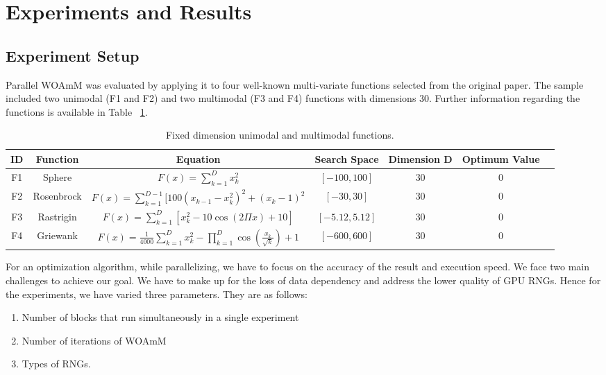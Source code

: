 \documentclass[conference]{IEEEtran}
\begin{document}
\section{Experiments and Results}

\subsection{Experiment Setup}

Parallel WOAmM was evaluated by applying it to four well-known multi-variate functions selected from the original paper. 
The sample included two unimodal (F1 and F2) and two multimodal (F3 and F4) functions with dimensions 30. 
Further information regarding the functions is available in Table ~\ref{tbl:func}.

\begin{table}[!t]\renewcommand{\arraystretch}{1.3}
\caption{Fixed dimension unimodal and multimodal functions.}
\label{tbl:func}
\centering
\begin{tabular}{c||c||c||c||c||c||c}
\hline\bfseries ID & \bfseries Function & \bfseries Equation & \bfseries Search Space & \bfseries Dimension D & \bfseries Optimum Value\\
\hline
\hline F1 & Sphere & \(F(x)=\sum_{k=1}^Dx_k^2\) & \([-100,100]\)&30&0\\
\hline
\hline F2 & Rosenbrock & \(F(x)=\sum_{k=1}^{D-1}[100(x_{k-1}-x_k^2)^2+(x_k-1)^2\) & \([-30,30]\)&30&0\\
\hline
\hline F3 & Rastrigin & \(F(x)=\sum_{k=1}^{D}[x_k^2-10\cos(2\Pi x)+10]\) & \([-5.12,5.12]\)&30&0\\
\hline
\hline F4 & Griewank & \(F(x)=\frac{1}{4000}\sum_{k=1}^{D}x_k^2-\prod_{k=1}^D\cos(\frac{x_k}{\sqrt{k}})+1\) & \([-600,600]\)&30&0\\
\hline
\end{tabular}
\end{table}

For an optimization algorithm, while parallelizing, we have to focus on the accuracy of the result and execution speed. 
We face two main challenges to achieve our goal. 
We have to make up for the loss of data dependency and address the lower quality of GPU RNGs. 
Hence for the experiments, we have varied three parameters. 
They are as follows:

\begin{enumerate}
    \item Number of blocks that run simultaneously in a single experiment
    \item Number of iterations of WOAmM
    \item Types of RNGs.
\end{enumerate}
\end{document}

